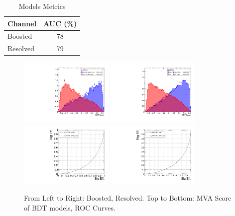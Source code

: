 \begin{table}[!ht]
  \centering
  \caption{Models Metrics}
  \begin{tabular}{lc}%
    \toprule
    Channel  & AUC (\%) \\
    \midrule
    Boosted  & 78       \\
    \midrule
    Resolved & 79       \\
    \bottomrule
  \end{tabular}\label{tab:training-score}
\end{table}

\begin{figure}[!ht]
  \centering
  \includegraphics[width=0.4\textwidth]{analysis_plots/tmva_plots/zv_BDTG14.pdf}
  \includegraphics[width=0.4\textwidth]{analysis_plots/tmva_plots/zjj_BDTG14.pdf} \\
  \includegraphics[width=0.4\textwidth]{analysis_plots/tmva_plots/zv_BDTG14_roc.pdf}
  \includegraphics[width=0.4\textwidth]{analysis_plots/tmva_plots/zjj_BDTG14_roc.pdf}
  \caption[MVA Score ROC Curve]%
  {From Left to Right: Boosted, Resolved. Top to Bottom: MVA Score of BDT models,
    ROC Curves.}%
  \label{fig:vbs-training-score}
\end{figure}

